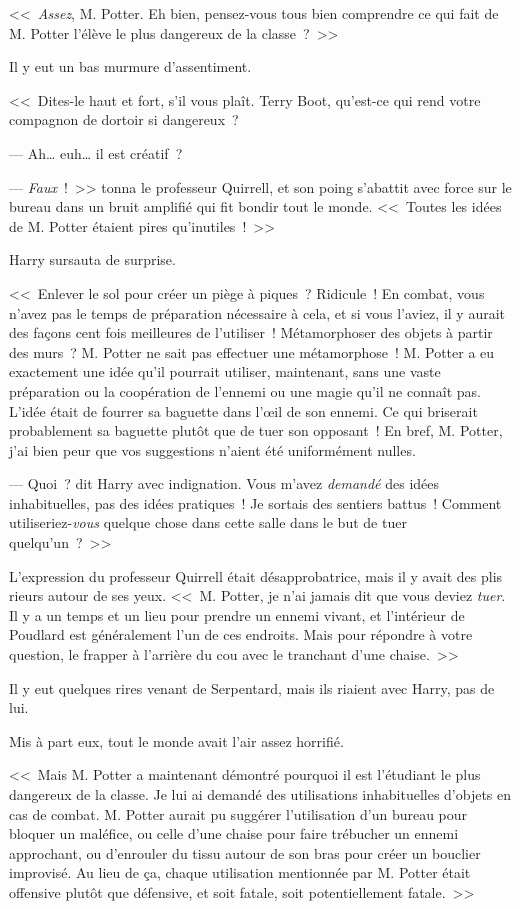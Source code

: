 <<~\emph{Assez}, M. Potter. Eh bien, pensez-vous tous bien comprendre ce qui fait de M. Potter l'élève le plus dangereux de la classe~?~>>

Il y eut un bas murmure d'assentiment.

<<~Dites-le haut et fort, s'il vous plaît. Terry Boot, qu'est-ce qui rend votre compagnon de dortoir si dangereux~?

--- Ah… euh… il est créatif~?

--- \emph{Faux}~!~>> tonna le professeur Quirrell, et son poing s'abattit avec force sur le bureau dans un bruit amplifié qui fit bondir tout le monde. <<~Toutes les idées de M. Potter étaient pires qu'inutiles~!~>>

Harry sursauta de surprise.

<<~Enlever le sol pour créer un piège à piques~? Ridicule~! En combat, vous n'avez pas le temps de préparation nécessaire à cela, et si vous l'aviez, il y aurait des façons cent fois meilleures de l'utiliser~! Métamorphoser des objets à partir des murs~? M. Potter ne sait pas effectuer une métamorphose~! M. Potter a eu exactement une idée qu'il pourrait utiliser, maintenant, sans une vaste préparation ou la coopération de l'ennemi ou une magie qu'il ne connaît pas. L'idée était de fourrer sa baguette dans l'œil de son ennemi. Ce qui briserait probablement sa baguette plutôt que de tuer son opposant~! En bref, M. Potter, j'ai bien peur que vos suggestions n'aient été uniformément nulles.

--- Quoi~? dit Harry avec indignation. Vous m'avez \emph{demandé} des idées inhabituelles, pas des idées pratiques~! Je sortais des sentiers battus~! Comment utiliseriez-\emph{vous} quelque chose dans cette salle dans le but de tuer quelqu'un~?~>>

L'expression du professeur Quirrell était désapprobatrice, mais il y avait des plis rieurs autour de ses yeux. <<~M. Potter, je n'ai jamais dit que vous deviez \emph{tuer}. Il y a un temps et un lieu pour prendre un ennemi vivant, et l'intérieur de Poudlard est généralement l'un de ces endroits. Mais pour répondre à votre question, le frapper à l'arrière du cou avec le tranchant d'une chaise.~>>

Il y eut quelques rires venant de Serpentard, mais ils riaient avec Harry, pas de lui.

Mis à part eux, tout le monde avait l'air assez horrifié.

<<~Mais M. Potter a maintenant démontré pourquoi il est l'étudiant le plus dangereux de la classe. Je lui ai demandé des utilisations inhabituelles d'objets en cas de combat. M. Potter aurait pu suggérer l'utilisation d'un bureau pour bloquer un maléfice, ou celle d'une chaise pour faire trébucher un ennemi approchant, ou d'enrouler du tissu autour de son bras pour créer un bouclier improvisé. Au lieu de ça, chaque utilisation mentionnée par M. Potter était offensive plutôt que défensive, et soit fatale, soit potentiellement fatale.~>>

